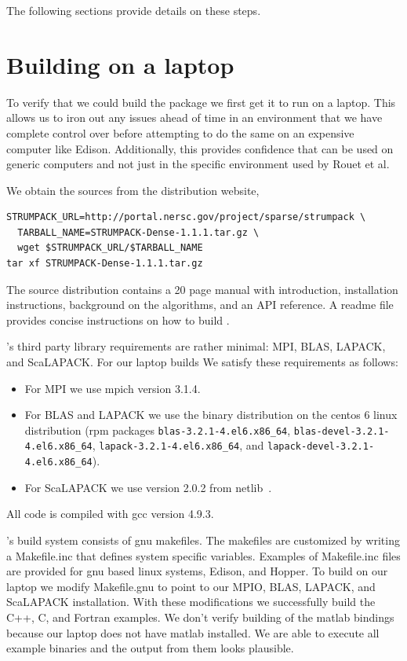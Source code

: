 \documentclass{acmsmall}
\begin{document}
The following sections provide details on these steps.


\section{Building \strumpack{} on a laptop}

To verify that we could build the package we first get it to run
on a laptop.  This allows us to iron out any issues ahead of time
in an environment that we have complete control over before
attempting to do the same on an expensive computer like Edison.
Additionally, this provides confidence that \strumpack{} can be
used on generic computers and not just in the specific
environment used by Rouet et al.

We obtain the sources from the \strumpack{} distribution website,
\begin{verbatim}
STRUMPACK_URL=http://portal.nersc.gov/project/sparse/strumpack \
  TARBALL_NAME=STRUMPACK-Dense-1.1.1.tar.gz \
  wget $STRUMPACK_URL/$TARBALL_NAME
tar xf STRUMPACK-Dense-1.1.1.tar.gz
\end{verbatim}

The source distribution contains a 20 page manual with
introduction, installation instructions, background on the
algorithms, and an API reference.  A readme file
provides concise instructions on how to build \strumpack{}.

\strumpack{}'s third party library requirements are rather
minimal: MPI, BLAS, LAPACK, and ScaLAPACK.  For our laptop builds
We satisfy these requirements as follows:
\begin{itemize}
\item For MPI we use mpich version 3.1.4.
\item For BLAS and LAPACK we use the binary distribution on
the centos 6 linux distribution (rpm packages
\verb!blas-3.2.1-4.el6.x86_64!,
\verb!blas-devel-3.2.1-4.el6.x86_64!,
\verb!lapack-3.2.1-4.el6.x86_64!, and
\verb!lapack-devel-3.2.1-4.el6.x86_64!).
\item For ScaLAPACK we use version 2.0.2 from netlib~\cite{netlib}.
\end{itemize}
All code is compiled with gcc version 4.9.3.

\strumpack{}'s build system consists of gnu makefiles.  The
makefiles are
customized by writing a Makefile.inc that defines system specific
variables.  Examples of Makefile.inc files are provided for gnu
based linux systems, Edison, and Hopper.  To build on our laptop
we modify Makefile.gnu to point to our MPIO, BLAS, LAPACK, and
ScaLAPACK installation.  With these modifications we successfully
build the C++, C, and Fortran examples.  We don't verify building
of the matlab bindings because our laptop does not have matlab
installed.  We are able to execute all example binaries and the
output from them looks plausible.
\end{document}
